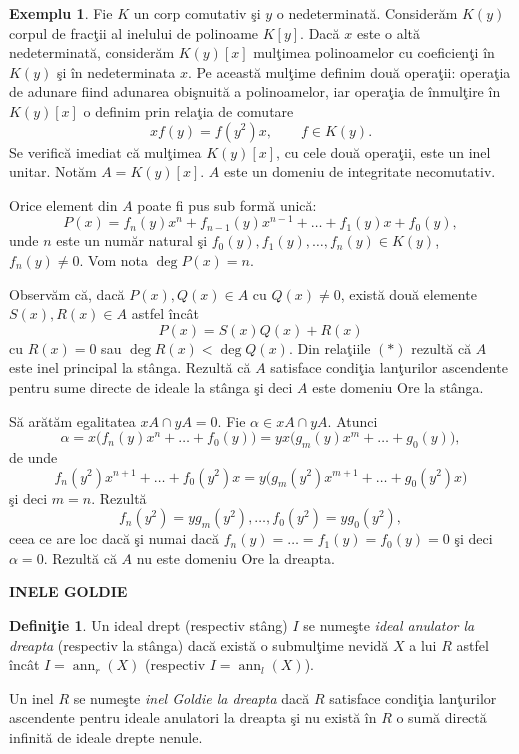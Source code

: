 \documentclass[12pt,a4paper]{book}
\theoremstyle{plain}
\theoremstyle{definition}
\newtheorem{definition}[theorem]{Definiţie}
\newtheorem{example}[theorem]{Exemplu}
\theoremstyle{remark}
\begin{document}
\begin{example}
Fie \(K\) un corp comutativ şi \(y\) o nedeterminată.
Considerăm \(K(y)\) corpul de fracţii al inelului de polinoame \(K[y]\).
Dacă \(x\) este o altă nedeterminată, considerăm \(K(y)[x]\) mulţimea
polinoamelor cu coeficienţi în \(K(y)\) şi în nedeterminata \(x\).
Pe această mulţime definim două operaţii: operaţia de adunare fiind
adunarea obişnuită a polinoamelor, iar operaţia de înmulţire în
\(K(y)[x]\) o definim prin relaţia de comutare
\[
x f(y) = f(y^{2})x, \qquad f \in K(y).
\]
Se verifică imediat că mulţimea \(K(y)[x]\), cu cele două operaţii,
este un inel unitar.
Notăm \(A = K(y)[x]\).
\(A\) este un domeniu de integritate necomutativ.

Orice element din \(A\) poate fi pus sub formă unică:
\[
P(x) = f_{n}(y)x^{n} + f_{n-1}(y)x^{n-1} + \dots + f_{1}(y)x + f_{0}(y),
\]
unde \(n\) este un număr natural şi
\(f_{0}(y), f_{1}(y), \dots, f_{n}(y) \in K(y)\), \(f_{n}(y) \neq 0\).
Vom nota \(\deg P(x) = n\).

Observăm că, dacă \(P(x), Q(x) \in A\) cu \(Q(x) \neq 0\), există
două elemente \(S(x), R(x) \in A\) astfel încât
\[
P(x) = S(x)Q(x) + R(x)
\tag{\(*\)}
\]
cu \(R(x) = 0\) sau \(\deg R(x) < \deg Q(x)\).
Din relaţiile \((*)\) rezultă că \(A\) este inel principal la stânga.
Rezultă că \(A\) satisface condiţia lanţurilor ascendente pentru sume
directe de ideale la stânga şi deci \(A\) este domeniu Ore la stânga.

Să arătăm egalitatea \(xA \cap yA = 0\).
Fie \(\alpha \in xA \cap yA\).
Atunci
\[
\alpha = x\bigl(f_{n}(y)x^{n} + \dots + f_{0}(y)\bigr)
       = yx\bigl(g_{m}(y)x^{m} + \dots + g_{0}(y)\bigr),
\]
de unde
\[
f_{n}(y^{2})x^{n+1} + \dots + f_{0}(y^{2})x
 = y\bigl(g_{m}(y^{2})x^{m+1} + \dots + g_{0}(y^{2})x\bigr)
\]
şi deci \(m = n\).
Rezultă
\[
f_{n}(y^{2}) = y g_{m}(y^{2}), \dots, f_{0}(y^{2}) = y g_{0}(y^{2}),
\]
ceea ce are loc dacă şi numai dacă
\(f_{n}(y) = \dots = f_{1}(y) = f_{0}(y) = 0\) şi deci \(\alpha = 0\).
Rezultă că \(A\) nu este domeniu Ore la dreapta.
\end{example}

\begin{center}
\textbf{INELE GOLDIE}
\end{center}

\begin{definition}
Un ideal drept (respectiv stâng) \(I\) se numeşte \emph{ideal anulator la dreapta}
(respectiv la stânga) dacă există o submulţime nevidă \(X\) a lui \(R\) astfel
încât \(I = \operatorname{ann}_{r}(X)\) (respectiv
\(I = \operatorname{ann}_{l}(X)\)).

Un inel \(R\) se numeşte \emph{inel Goldie la dreapta} dacă \(R\) satisface
condiţia lanţurilor ascendente pentru ideale anulatori la dreapta şi nu
există în \(R\) o sumă directă infinită de ideale drepte nenule.
\end{definition}
\end{document}
